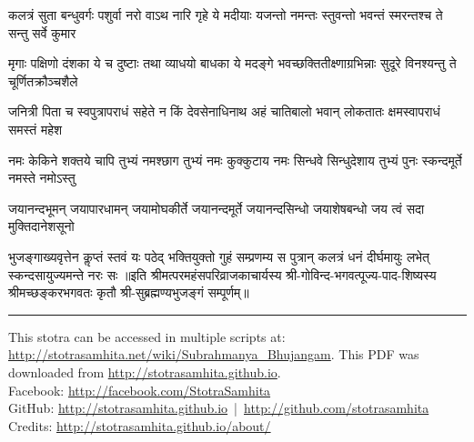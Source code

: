 \documentclass[a5paper,twoside,12pt]{book}
\begin{document}
\begin{center}
\fourlineindentedshloka
{कलत्रं सुता बन्धुवर्गः पशुर्वा}
{नरो वाऽथ नारि गृहे ये मदीयाः}
{यजन्तो नमन्तः स्तुवन्तो भवन्तं}
{स्मरन्तश्च ते सन्तु सर्वे कुमार}

\fourlineindentedshloka
{मृगाः पक्षिणो दंशका ये च दुष्टाः}
{तथा व्याधयो बाधका ये मदङ्गे}
{भवच्छक्तितीक्ष्णाग्रभिन्नाः सुदूरे}
{विनश्यन्तु ते चूर्णितक्रौञ्चशैले}

\fourlineindentedshloka
{जनित्री पिता च स्वपुत्रापराधं}
{सहेते न किं देवसेनाधिनाथ}
{अहं चातिबालो भवान् लोकतातः}
{क्षमस्वापराधं समस्तं महेश}

\fourlineindentedshloka
{नमः केकिने शक्तये चापि तुभ्यं}
{नमश्छाग तुभ्यं नमः कुक्कुटाय}
{नमः सिन्धवे सिन्धुदेशाय तुभ्यं}
{पुनः स्कन्दमूर्ते नमस्ते नमोऽस्तु}

\fourlineindentedshloka
{जयानन्दभूमन् जयापारधामन्}
{जयामोघकीर्ते जयानन्दमूर्ते}
{जयानन्दसिन्धो जयाशेषबन्धो}
{जय त्वं सदा मुक्तिदानेशसूनो}

\fourlineindentedshloka
{भुजङ्गाख्यवृत्तेन कॢप्तं स्तवं यः}
{पठेद् भक्तियुक्तो गुहं सम्प्रणम्य}
{स पुत्रान् कलत्रं धनं दीर्घमायुः}
{लभेत् स्कन्दसायुज्यमन्ते नरः सः}
॥इति श्रीमत्परमहंसपरिव्राजकाचार्यस्य श्री-गोविन्द-भगवत्पूज्य-पाद-शिष्यस्य
श्रीमच्छङ्करभगवतः कृतौ श्री-सुब्रह्मण्यभुजङ्गं सम्पूर्णम्॥\end{center}
\vfill
\hrule
\footnotesize
{}
\textsf{This stotra can be accessed in multiple scripts at:\\
\url{http://stotrasamhita.net/wiki/Subrahmanya_Bhujangam}. This PDF was downloaded from \url{http://stotrasamhita.github.io}.\\[1ex]
Facebook: \url{http://facebook.com/StotraSamhita}\\[0.7ex]
GitHub: \url{http://stotrasamhita.github.io}~|~\url{http://github.com/stotrasamhita}\\[0.7ex]
Credits: \url{http://stotrasamhita.github.io/about/}}
\end{document}

